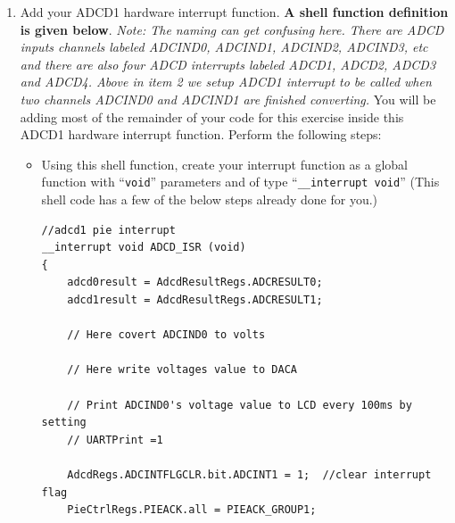 \documentclass[11pt]{article}
\begin{document}
\begin{enumerate}
\begin{verbatim}
    DacbRegs.DACVALS.bit.DACVALS = DACOutInt;
}
\end{verbatim}
    \item Add your ADCD1 hardware interrupt function. \textbf{A shell function definition is given below}. \textit{Note: The naming can get confusing here. There are ADCD inputs channels labeled ADCIND0, ADCIND1, ADCIND2, ADCIND3, etc and there are also four ADCD interrupts labeled ADCD1, ADCD2, ADCD3 and ADCD4. Above in item 2 we setup ADCD1 interrupt to be called when two channels ADCIND0 and ADCIND1 are finished converting.} You will be adding most of the remainder of your code for this exercise inside this ADCD1 hardware interrupt function. Perform the following steps:
        \begin{itemize}
                \item Using this shell function, create your interrupt function as a global function with “\texttt{void}” parameters and of type “\texttt{__interrupt void}” (This shell code has a few of the below steps already done for you.)
\begin{verbatim}
//adcd1 pie interrupt
__interrupt void ADCD_ISR (void)
{
    adcd0result = AdcdResultRegs.ADCRESULT0;
    adcd1result = AdcdResultRegs.ADCRESULT1;

    // Here covert ADCIND0 to volts

    // Here write voltages value to DACA

    // Print ADCIND0's voltage value to LCD every 100ms by setting
    // UARTPrint =1

    AdcdRegs.ADCINTFLGCLR.bit.ADCINT1 = 1;  //clear interrupt flag
    PieCtrlRegs.PIEACK.all = PIEACK_GROUP1;


\end{verbatim}
\end{itemize}
\end{enumerate}
\end{document}

